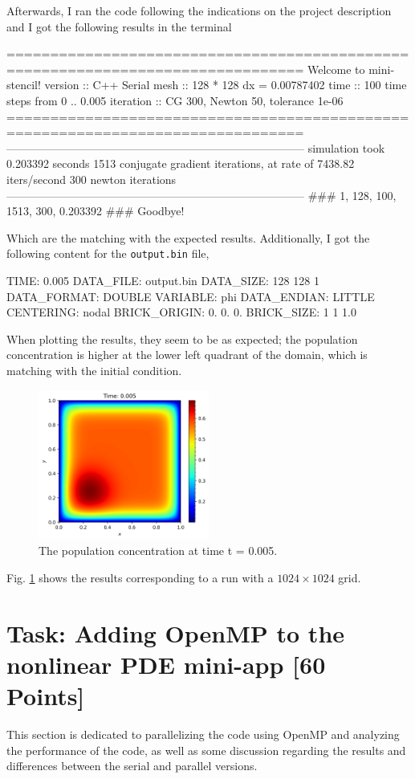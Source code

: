 \documentclass[unicode,11pt,a4paper,oneside,numbers=endperiod,openany]{scrartcl}
\begin{document}
Afterwards, I ran the code following the indications on the project description
and I got the following results in the terminal
\begin{grayverbatim}
================================================================================
                      Welcome to mini-stencil!
version   :: C++ Serial
mesh      :: 128 * 128 dx = 0.00787402
time      :: 100 time steps from 0 .. 0.005
iteration :: CG 300, Newton 50, tolerance 1e-06
================================================================================
--------------------------------------------------------------------------------
simulation took 0.203392 seconds
1513 conjugate gradient iterations, at rate of 7438.82 iters/second
300 newton iterations
--------------------------------------------------------------------------------
### 1, 128, 100, 1513, 300, 0.203392 ###
Goodbye!
\end{grayverbatim}
Which are the matching with the expected results.
Additionally, I got the following content for the \texttt{output.bin} file,
\begin{grayverbatim}
TIME: 0.005
DATA_FILE: output.bin
DATA_SIZE: 128 128 1
DATA_FORMAT: DOUBLE
VARIABLE: phi
DATA_ENDIAN: LITTLE
CENTERING: nodal
BRICK_ORIGIN: 0. 0. 0.
BRICK_SIZE: 1 1  1.0
\end{grayverbatim}
When plotting the results, they seem to be as expected; the population concentration is higher at
the lower left quadrant of the domain, which is matching with the initial condition.
\begin{figure}[!h]
    \centering
    \includegraphics[width=0.5\textwidth]{../mini_app/output_high_res.png}
    \caption{The population concentration at time t = 0.005.}
    \label{im:final_time}
\end{figure}
Fig. \ref{im:final_time} shows the results corresponding to a run with a $1024 \times 1024$ grid.

\section{Task:  Adding OpenMP to the nonlinear PDE mini-app [60 Points]}
This section is dedicated to parallelizing the code using OpenMP and analyzing
the performance of the code, as well as some discussion regarding the results
and differences between the serial and parallel versions.
\end{document}
